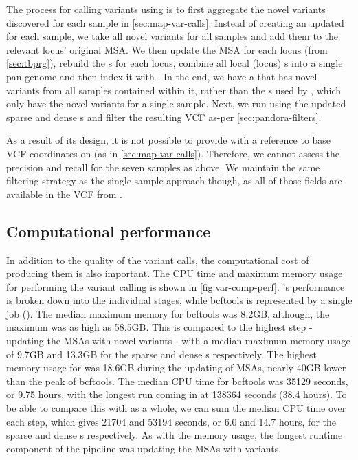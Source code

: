 The process for calling variants using  is to first aggregate the novel variants discovered for each sample in \autoref{sec:map-var-calls}. Instead of creating an updated \prg{} for each sample, we take all novel variants for all samples and add them to the relevant locus' original MSA. We then update the MSA for each locus (from \autoref{sec:tbprg}), rebuild the \prg{}s for each locus, combine all local (locus) \prg{}s into a single pan-genome \prg{} and then index it with \pandora{}. In the end, we have a \prg{} that has novel variants from all samples contained within it, rather than the \prg{}s used by , which only have the novel variants for a single sample.
Next, we run  using the updated sparse and dense \prg{}s and filter the resulting VCF as-per \autoref{sec:pandora-filters}.

As a result of its design, it is not possible to provide  with a reference to base VCF coordinates on (as in \autoref{sec:map-var-calls}). Therefore, we cannot assess the precision and recall for the seven samples as above. We maintain the same filtering strategy as the single-sample approach though, as all of those fields are available in the VCF from .

\subsection{Computational performance}
\label{sec:var-call-comp-perf}

In addition to the quality of the variant calls, the computational cost of producing them is also important. The CPU time and maximum memory usage for performing the \ont{} variant calling is shown in \autoref{fig:var-comp-perf}. \pandora{}'s performance is broken down into the individual stages, while bcftools is represented by a single job (). The median maximum memory for bcftools was 8.2GB, although, the maximum was as high as 58.5GB. This is compared to the highest \pandora{} step - updating the MSAs with novel variants - with a median maximum memory usage of 9.7GB and 13.3GB for the sparse and dense \prg{}s respectively. The highest memory usage for \pandora{} was 18.6GB during the updating of MSAs, nearly 40GB lower than the peak of bcftools. The median CPU time for bcftools was 35129 seconds, or 9.75 hours, with the longest run coming in at 138364 seconds (38.4 hours). To be able to compare this with \pandora{} as a whole, we can sum the median CPU time over each step, which gives 21704 and 53194 seconds, or 6.0 and 14.7 hours, for the sparse and dense \prg{}s respectively. As with the memory usage, the longest runtime component of the \pandora{} pipeline was updating the MSAs with \denovo{} variants.


